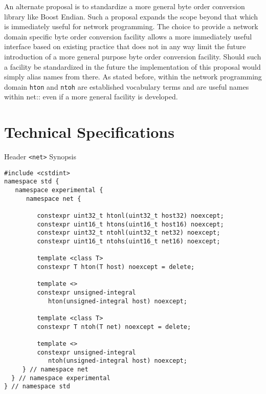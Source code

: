 \documentclass[12pt,twoside]{article}
\begin{document}
An alternate proposal is to standardize a more general byte order conversion library like Boost Endian. Such a proposal expands the scope beyond that which is immediately useful for network programming. The choice to provide a network domain specific byte order conversion facility allows a more immediately useful interface based on existing practice that does not in any way limit the future introduction of a more general purpose byte order conversion facility. Should such a facility be standardized in the future the implementation of this proposal would simply alias names from there. As stated before, within the network programming domain \texttt{hton} and \texttt{ntoh}
are established vocabulary terms and are useful names within net:: even if a more general facility is developed.

\section{Technical Specifications}
Header \texttt{<net>} Synopsis
\begin{lstlisting}
#include <cstdint>
namespace std {
   namespace experimental {
      namespace net {
 
         constexpr uint32_t htonl(uint32_t host32) noexcept;
         constexpr uint16_t htons(uint16_t host16) noexcept;
         constexpr uint32_t ntohl(uint32_t net32) noexcept;
         constexpr uint16_t ntohs(uint16_t net16) noexcept;
 
         template <class T>
         constexpr T hton(T host) noexcept = delete;
         
         template <>
         constexpr unsigned-integral 
            hton(unsigned-integral host) noexcept;
            
         template <class T>
         constexpr T ntoh(T net) noexcept = delete;
         
         template <>
         constexpr unsigned-integral 
            ntoh(unsigned-integral host) noexcept;
     } // namespace net
  } // namespace experimental
} // namespace std
\end{lstlisting}
 
\end{document}
